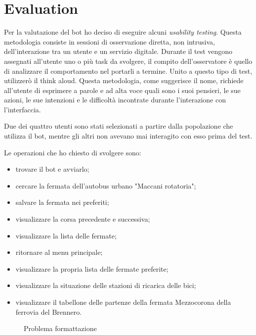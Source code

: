 \chapter{Evaluation}
\label{cha:evaluation}

Per la valutazione del bot ho deciso di eseguire alcuni \textit{usability testing}. Questa metodologia consiste in sessioni di osservazione diretta, non intrusiva, dell’interazione tra un utente e un servizio digitale. Durante il test vengono assegnati all’utente uno o più task da svolgere, il compito dell’osservatore è quello di analizzare il comportamento nel portarli a termine. Unito a questo tipo di test, utilizzerò il think aloud. Questa metodologia, come suggerisce il nome, richiede all'utente di esprimere a parole e ad alta voce quali sono i suoi pensieri, le sue azioni, le sue intenzioni e le difficoltà incontrate durante l'interazione con l’interfaccia.


Due dei quattro utenti sono stati selezionati a partire dalla popolazione che utilizza il bot, mentre gli altri non avevano mai interagito con esso prima del test. 

\noindent Le operazioni che ho chiesto di svolgere sono:
\begin{itemize}
    \item trovare il bot e avviarlo;
    \item cercare la fermata dell'autobus urbano "Maccani rotatoria";
    \item salvare la fermata nei preferiti;
    \item visualizzare la corsa precedente e successiva;
    \item visualizzare la lista delle fermate; 
    \item ritornare al menu principale; 
    \item visualizzare la propria lista delle fermate preferite;
    \item visualizzare la situazione delle stazioni di ricarica delle bici;
    \item visualizzare il tabellone delle partenze della fermata Mezzocorona della ferrovia del Brennero.
\end{itemize}

\begin{wrapfigure}{r}{0.38\textwidth}
\centering
{}
\caption{Problema formattazione}
\label{fig:bot-large-font}
\end{wrapfigure}



